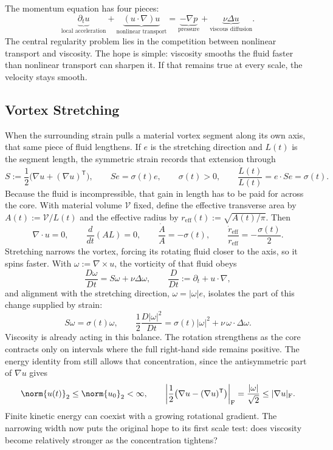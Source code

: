 
The momentum equation has four pieces:
\[
  \underbrace{\partial_t u}_{\text{local acceleration}}
  +
  \underbrace{(u\cdot\nabla)u}_{\text{nonlinear transport}}
  =
  \underbrace{-\nabla p}_{\text{pressure}}
  +
  \underbrace{\nu\Delta u}_{\text{viscous diffusion}}.
\]
The central regularity problem lies in the competition between nonlinear transport and viscosity.
The hope is simple: viscosity smooths the fluid faster than nonlinear transport can sharpen it.
If that remains true at every scale, the velocity stays smooth.

\subsection{Vortex Stretching}\label{sub:ThePerfectlyStretchingVortex}

When the surrounding strain pulls a material vortex segment along its own axis, that same piece of fluid lengthens. If \(e\) is the stretching direction and \(L(t)\) is the segment length, the symmetric strain records that extension through
\[
  S:=\frac12\bigl(\nabla u+(\nabla u)^{\mathsf T}\bigr),
  \qquad
  Se=\sigma(t)e,
  \qquad
  \sigma(t)>0,
  \qquad
  \frac{\dot L(t)}{L(t)}
  =
  e\cdot Se
  =
  \sigma(t).
\]
Because the fluid is incompressible, that gain in length has to be paid for across the core. With material volume \(\mathcal V\) fixed, define the effective transverse area by \(A(t):=\mathcal V/L(t)\) and the effective radius by \(r_{\mathrm{eff}}(t):=\sqrt{A(t)/\pi}\). Then
\[
  \nabla\cdot u=0,
  \qquad
  \frac{d}{dt}(A L)=0,
  \qquad
  \frac{\dot A}{A}=-\sigma(t),
  \qquad
  \frac{\dot r_{\mathrm{eff}}}{r_{\mathrm{eff}}}
  =
  -\frac{\sigma(t)}{2}.
\]
Stretching narrows the vortex, forcing its rotating fluid closer to the axis, so it spins faster. With \(\omega:=\nabla\times u\), the vorticity of that fluid obeys
\[
  \frac{D\omega}{Dt}
  =
  S\omega+\nu\Delta\omega,
  \qquad
  \frac{D}{Dt}
  :=
  \partial_t+u\cdot\nabla,
\]
and alignment with the stretching direction, \(\omega=|\omega|e\), isolates the part of this change supplied by strain:
\[
  S\omega
  =
  \sigma(t)\omega,
  \qquad
  \frac12\frac{D|\omega|^2}{Dt}
  =
  \sigma(t)|\omega|^2
  +
  \nu\,\omega\cdot\Delta\omega.
\]
Viscosity is already acting in this balance. The rotation strengthens as the core contracts only on intervals where the full right-hand side remains positive. The energy identity from  still allows that concentration, since the antisymmetric part of \(\nabla u\) gives
\[
  \norm{u(t)}_2
  \leq
  \norm{u_0}_2
  <\infty,
  \qquad
  \left|\frac12\bigl(\nabla u-(\nabla u)^{\mathsf T}\bigr)\right|_{\mathrm F}
  =
  \frac{|\omega|}{\sqrt2}
  \leq
  |\nabla u|_{\mathrm F}.
\]
Finite kinetic energy can coexist with a growing rotational gradient. The narrowing width now puts the original hope to its first scale test: does viscosity become relatively stronger as the concentration tightens?

